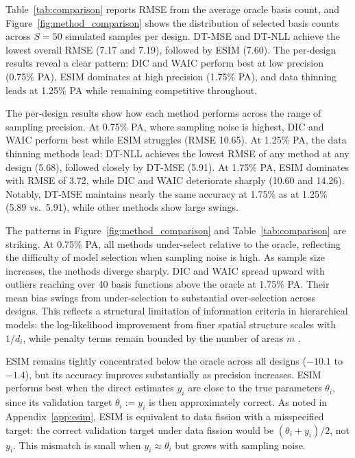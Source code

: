 \documentclass[11pt]{article}
\theoremstyle{plain}
\theoremstyle{definition}
\theoremstyle{remark}
\begin{document}
Table~\ref{tab:comparison} reports RMSE from the average oracle
basis count, and Figure~\ref{fig:method_comparison} shows the
distribution of selected basis counts across $S = 50$ simulated samples
per design. DT-MSE and DT-NLL achieve the lowest overall RMSE (7.17 and
7.19), followed by ESIM (7.60). The per-design results reveal a clear pattern: DIC and WAIC perform best at low precision (0.75\% PA), ESIM dominates at high precision (1.75\% PA), and data thinning leads at 1.25\% PA while remaining competitive throughout.

The per-design results show how each method performs across the range of
sampling precision. At 0.75\% PA, where sampling noise is highest, DIC
and WAIC perform best while ESIM struggles (RMSE 10.65). At 1.25\% PA,
the data thinning methods lead: DT-NLL achieves the lowest RMSE of any
method at any design (5.68), followed closely by DT-MSE (5.91). At
1.75\% PA, ESIM dominates with RMSE of 3.72, while DIC and WAIC
deteriorate sharply (10.60 and 14.26). Notably, DT-MSE maintains nearly
the same accuracy at 1.75\% as at 1.25\% (5.89 vs.\ 5.91), while other
methods show large swings.

The patterns in Figure~\ref{fig:method_comparison} and
Table~\ref{tab:comparison} are striking. At 0.75\% PA, all methods
under-select relative to the oracle, reflecting the difficulty of model
selection when sampling noise is high. As sample size increases, the
methods diverge sharply. DIC and WAIC spread upward with outliers
reaching over 40 basis functions above the oracle at 1.75\% PA. Their
mean bias swings from under-selection to substantial over-selection
across designs. This
reflects a structural limitation of information criteria in hierarchical
models: the log-likelihood improvement from finer spatial structure
scales with $1/d_i$, while penalty terms remain bounded by the number of
areas $m$ \citep{gelman_understanding_2014}.

ESIM remains tightly concentrated below the oracle across all designs
($-10.1$ to $-1.4$), but its accuracy improves substantially as
precision increases. ESIM performs best when the direct estimates $y_i$
are close to the true parameters $\theta_i$, since its validation target
$\theta_i := y_i$ is then approximately correct. As noted in
Appendix~\ref{app:esim}, ESIM is equivalent to data fission with a misspecified
target: the correct validation target under data fission would be
$(\theta_i + y_i)/2$, not $y_i$. This mismatch is small when
$y_i \approx \theta_i$ but grows with sampling noise.
\end{document}
